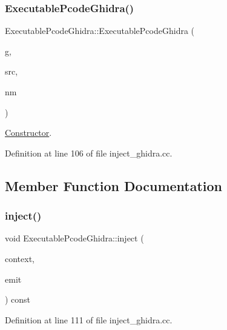\subsubsection{\texorpdfstring{ExecutablePcodeGhidra()}{ExecutablePcodeGhidra()}}
{\footnotesize\ttfamily Executable\+Pcode\+Ghidra\+::\+Executable\+Pcode\+Ghidra (\begin{DoxyParamCaption}\item[{\mbox{\hyperlink{class_architecture}{Architecture}} $\ast$}]{g,  }\item[{const string \&}]{src,  }\item[{const string \&}]{nm }\end{DoxyParamCaption})}



\mbox{\hyperlink{class_constructor}{Constructor}}. 



Definition at line 106 of file inject\+\_\+ghidra.\+cc.



\subsection{Member Function Documentation}
\mbox{\label{class_executable_pcode_ghidra_a51caea71fd7a73b67c1d6e36754ad2a7}} 
\subsubsection{\texorpdfstring{inject()}{inject()}}
{\footnotesize\ttfamily void Executable\+Pcode\+Ghidra\+::inject (\begin{DoxyParamCaption}\item[{\mbox{\hyperlink{class_inject_context}{Inject\+Context}} \&}]{context,  }\item[{\mbox{\hyperlink{class_pcode_emit}{Pcode\+Emit}} \&}]{emit }\end{DoxyParamCaption}) const\hspace{0.3cm}{\ttfamily [virtual]}}



Definition at line 111 of file inject\+\_\+ghidra.\+cc.

\mbox{\label{class_executable_pcode_ghidra_a3bd44f4e622300a02e80b482cb31c3ea}} 
